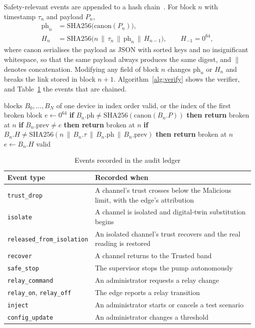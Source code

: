 Safety-relevant events are appended to a hash chain~\cite{haber1991timestamp}. For block $n$ with timestamp $\tau_n$ and payload $P_n$,
\begin{align}
\mathrm{ph}_n &= \mathrm{SHA256}\big(\mathrm{canon}(P_n)\big), \\
H_n &= \mathrm{SHA256}\big(n \,\|\, \tau_n \,\|\, \mathrm{ph}_n \,\|\, H_{n-1}\big), \qquad H_{-1} = 0^{64},
\end{align}
where $\mathrm{canon}$ serialises the payload as JSON with sorted keys and no insignificant whitespace, so that the same payload always produces the same digest, and $\|$ denotes concatenation. Modifying any field of block $n$ changes $\mathrm{ph}_n$ or $H_n$ and breaks the link stored in block $n+1$. Algorithm~\ref{alg:verify} shows the verifier, and Table~\ref{tab:ledgerevents} the events that are chained.

\begin{algorithm}[H]
\caption{Ledger verification}
\label{alg:verify}
\begin{algorithmic}[1]
\Require blocks $B_0, \dots, B_N$ of one device in index order
\Ensure valid, or the index of the first broken block
\State $e \gets 0^{64}$
  \State \textbf{if} $B_n.\mathrm{ph} \neq \mathrm{SHA256}(\mathrm{canon}(B_n.P))$ \textbf{then return} broken at $n$
  \State \textbf{if} $B_n.\mathrm{prev} \neq e$ \textbf{then return} broken at $n$
  \State \textbf{if} $B_n.H \neq \mathrm{SHA256}(n \,\|\, B_n.\tau \,\|\, B_n.\mathrm{ph} \,\|\, B_n.\mathrm{prev})$ \textbf{then return} broken at $n$
  \State $e \gets B_n.H$
\EndFor
\State \Return valid
\end{algorithmic}
\end{algorithm}

\begin{table}[htbp]
\centering
\caption{Events recorded in the audit ledger}
\label{tab:ledgerevents}
\small
\begin{tabularx}{\textwidth}{@{}l X@{}}
\toprule
\textbf{Event type} & \textbf{Recorded when} \\
\midrule
\texttt{trust\_drop} & A channel's trust crosses below the Malicious limit, with the edge's attribution \\
\texttt{isolate} & A channel is isolated and digital-twin substitution begins \\
\texttt{released\_from\_isolation} & An isolated channel's trust recovers and the real reading is restored \\
\texttt{recover} & A channel returns to the Trusted band \\
\texttt{safe\_stop} & The supervisor stops the pump autonomously \\
\texttt{relay\_command} & An administrator requests a relay change \\
\texttt{relay\_on}, \texttt{relay\_off} & The edge reports a relay transition \\
\texttt{inject} & An administrator starts or cancels a test scenario \\
\texttt{config\_update} & An administrator changes a threshold \\
\bottomrule
\end{tabularx}
\end{table}

